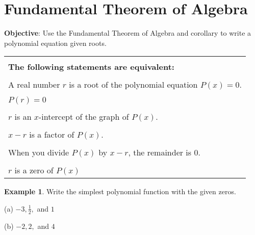 \documentclass{report}
\theoremstyle{definition}
\newtheorem{example}{\bf Example}
\begin{document}
 \section{ Fundamental Theorem of Algebra  }
 \noindent \hfill\small \noindent \textbf{Objective}: Use the Fundamental Theorem of Algebra and corollary to write a polynomial equation given roots. \normalsize\\
 \setcounter{example}{0}
 \setcounter{definition}{0}

\vspace{-0.5cm}

\begin{center}
	\begin{tabular}[t]{|l|}
		\hline
		\\
		\textbf{The following statements are equivalent:}\\
		\hline
		\\
		A real number $r$ is a root of the polynomial equation $P(x)=0$.\\
		\hline
		\\
		$P(r)=0$\\
		\hline
		\\
		$r$ is an $x$-intercept of the graph of $P(x)$.\\
		\hline
		\\
		$x-r$ is a factor of $P(x)$.\\
		\hline
		\\
		When you divide $P(x)$ by $x-r$, the remainder is $0$.\\
		\hline
		\\
		$r$ is a zero of $P(x)$\\
		\hline
	\end{tabular}
\end{center}


\begin{example}
Write the simplest polynomial function with the given zeros.
\end{example}

\vspace{0.25cm}

\begin{minipage}[t]{0.45\linewidth}
(a)  $-3, \displaystyle\frac{1}{2},$ and $1$
\end{minipage}
\hfill
\begin{minipage}[t]{0.45\linewidth}
(b) $-2, 2,$ and  $4$
\end{minipage}
\end{document}
